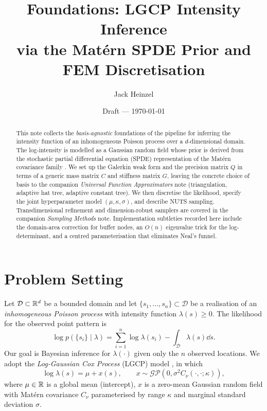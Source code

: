\documentclass[11pt]{article}
\title{Foundations: LGCP Intensity Inference\\
via the Mat\'ern SPDE Prior and FEM Discretisation}
\author{Jack Heinzel}
\date{Draft --- \today}
\begin{document}
\maketitle

\begin{abstract}
This note collects the \emph{basis-agnostic} foundations of the pipeline for
inferring the intensity function of an inhomogeneous Poisson process over a
$d$-dimensional domain.  The log-intensity is modelled as a Gaussian random
field whose prior is derived from the stochastic partial differential equation
(SPDE) representation of the Mat\'ern covariance family \citep{lindgren2011}.
We set up the Galerkin weak form and the precision matrix $Q$ in terms of a
generic mass matrix $C$ and stiffness matrix $G$, leaving the concrete choice of
basis to the companion \emph{Universal Function Approximators} note (triangulation,
adaptive hat tree, adaptive constant tree).  We then discretise the likelihood,
specify the joint hyperparameter model $(\mu,\kappa,\sigma)$, and describe NUTS
sampling.  Transdimensional refinement and dimension-robust samplers are covered
in the companion \emph{Sampling Methods} note.  Implementation subtleties
recorded here include the domain-area correction for buffer nodes, an $O(n)$
eigenvalue trick for the log-determinant, and a centred parameterisation that
eliminates Neal's funnel.
\end{abstract}

\tableofcontents
\bigskip

\section{Problem Setting}

Let $\mathcal{D} \subset \mathbb{R}^d$ be a bounded domain and let
$\{s_1, \ldots, s_n\} \subset \mathcal{D}$ be a realisation of an
\emph{inhomogeneous Poisson process} with intensity function $\lambda(s) \ge 0$.
The likelihood for the observed point pattern is
\begin{equation}
  \log p(\{s_i\} \mid \lambda) = \sum_{i=1}^n \log \lambda(s_i) - \int_{\mathcal{D}} \lambda(s) \dd s.
  \label{eq:poisson-ll}
\end{equation}
Our goal is Bayesian inference for $\lambda(\cdot)$ given only the $n$
observed locations.  We adopt the \emph{Log-Gaussian Cox Process} (LGCP)
model \citep{moller1998lgcp}, in which
\begin{equation}
  \log \lambda(s) = \mu + x(s), \qquad x \sim \mathcal{GP}(0, \sigma^2 C_\nu(\cdot,\cdot;\kappa)),
  \label{eq:lgcp}
\end{equation}
where $\mu \in \mathbb{R}$ is a global mean (intercept), $x$ is a zero-mean Gaussian
random field with Mat\'ern covariance $C_\nu$ parameterised by range $\kappa$
and marginal standard deviation $\sigma$.
\end{document}
